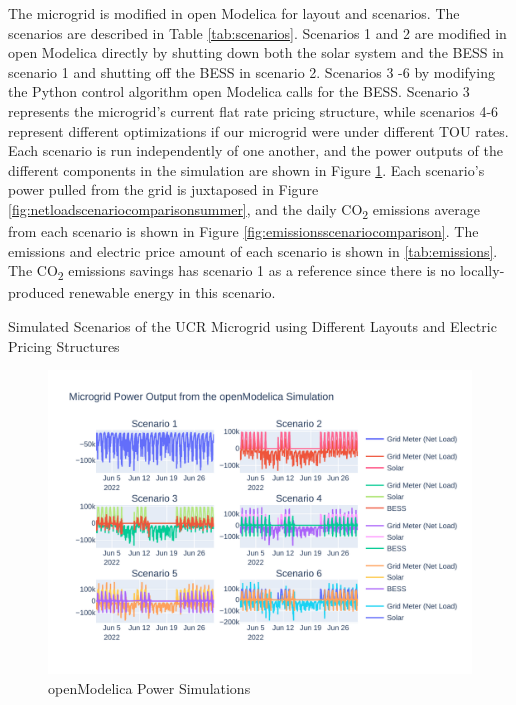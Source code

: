 \documentclass[conference]{IEEEtran}
\begin{document}
	The microgrid is modified in open Modelica for layout and scenarios. The scenarios are described in Table \ref{tab:scenarios}. Scenarios 1 and 2 are modified in open Modelica directly by shutting down both the solar system and the BESS in scenario 1 and shutting off the BESS in scenario 2. Scenarios 3 -6 by modifying the Python control algorithm open Modelica calls for the BESS. Scenario 3 represents the microgrid's current flat rate pricing structure, while scenarios 4-6 represent different optimizations if our microgrid were under different TOU rates. Each scenario is run independently of one another, and the power outputs of the different components in the simulation are shown in Figure \ref{fig:scenariosubplot}.
	 Each scenario's power pulled from the grid is juxtaposed in Figure \ref{fig:netloadscenariocomparisonsummer}, and the daily CO\textsubscript{2} emissions average from each scenario is shown in Figure \ref{fig:emissionsscenariocomparison}. The emissions and electric price amount of each scenario is shown in \ref{tab:emissions}. The CO\textsubscript{2} emissions savings has scenario 1 as a reference since there is no locally-produced renewable energy in this scenario. 
	     	\begin{table}[H]
	 	\caption{Simulated Scenarios of the UCR Microgrid using Different Layouts and Electric Pricing Structures}
	 	\tiny
	 	
	 	\normalsize
	 	\label{tab:scenarios}
	 \end{table}
	 
	 \begin{figure}
	 	\centering
	 	\includegraphics[width=0.9\linewidth]{Fig/scenario_subplot}
	 	\caption{openModelica Power Simulations}
	 	\label{fig:scenariosubplot}
	 \end{figure}
	
\end{document}
